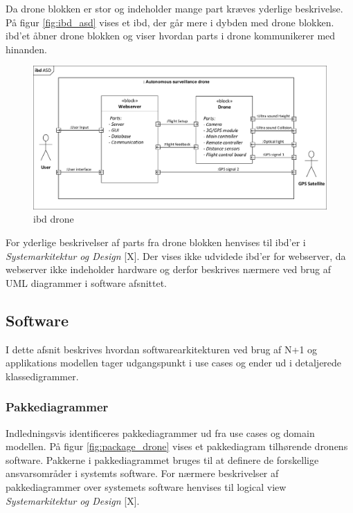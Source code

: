 Da drone blokken er stor og indeholder mange part kræves yderlige beskrivelse. På figur \ref{fig:ibd_asd} vises et ibd, der går mere i dybden med drone blokken. ibd'et åbner drone blokken og viser hvordan parts i drone kommunikerer med hinanden. 

\begin{figure}[H]
	\centering
	\includegraphics[width=1\textwidth]{Billeder/Projektbeskrivelse/ibd1_overordnet.pdf}
	\caption{ibd drone}
	\label{fig:ibd_drone}
\end{figure}


For yderlige beskrivelser af parts fra drone blokken henvises til ibd'er i \textit{Systemarkitektur og Design} [X].
Der vises ikke udvidede ibd'er for webserver, da webserver ikke indeholder hardware og derfor beskrives nærmere ved brug af UML diagrammer i software afsnittet.



\newpage

\subsection{Software}

I dette afsnit beskrives hvordan softwarearkitekturen ved brug af N+1 og applikations modellen tager udgangspunkt i use cases og ender ud i detaljerede klassedigrammer. 
   
\subsubsection*{Pakkediagrammer}
\vspace{-0.3cm}	
Indledningsvis identificeres pakkediagrammer ud fra use cases og domain modellen. På figur \ref{fig:package_drone} vises et pakkediagram tilhørende dronens software. Pakkerne i pakkediagrammet bruges til at definere de forskellige ansvarsområder i systemts software. For nærmere beskrivelser af pakkediagrammer over systemets software henvises til logical view \textit{Systemarkitektur og Design} [X].
 
